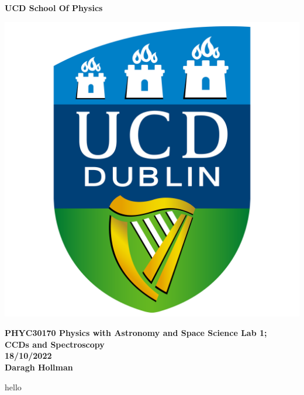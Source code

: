 \documentclass[a4paper,12pt,twocolumn]{article}
\begin{document}
	
	\begin{titlepage}
		\begin{center}
			
			\thispagestyle{empty}
			
			\Huge{
				\textbf{UCD School Of Physics}
			}
			
			\vspace{1cm}	
			
			\includegraphics[scale=0.08]{UCDLogo.png}
			
			\vspace{1cm}
			
			\large{
				\textbf{PHYC30170 Physics with Astronomy and Space Science Lab 1; \\
					CCDs and Spectroscopy \\
					\vspace{1cm}
					18/10/2022 \\
					\vspace{1cm}
					Daragh Hollman}
			} \\
			
		\end{center}
	\end{titlepage}
	hello
\end{document}
